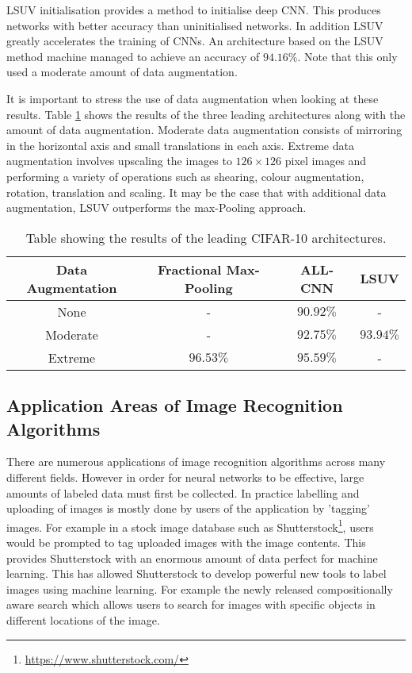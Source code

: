 LSUV initialisation provides a method to initialise deep CNN. This produces networks with better accuracy than uninitialised networks. In addition LSUV greatly accelerates the training of CNNs. An architecture based on the LSUV method machine managed to achieve an accuracy of $94.16\%$. Note that this only used a moderate amount of data augmentation.

It is important to stress the use of data augmentation when looking at these results. Table \ref{tab:SOA_res} shows the results of the three leading architectures along with the amount of data augmentation. Moderate data augmentation consists of mirroring in the horizontal axis and small translations in each axis. Extreme data augmentation involves upscaling the images to $126\times126$ pixel images and performing a variety of operations such as shearing, colour augmentation, rotation, translation and scaling. It may be the case that with additional data augmentation, LSUV outperforms the max-Pooling approach.

\begin{table}[h]
\begin{center}
 \begin{tabular}{||c | c c c||}
 \hline
 \textbf{Data Augmentation} & \textbf{Fractional Max-Pooling} & \textbf{ALL-CNN} & \textbf{LSUV} \\ [0.5ex]
 \hline
 None & - & $90.92\%$ & - \\
 \hline
 Moderate & - & $92.75\%$ & $93.94\%$\\
 \hline
 Extreme & $96.53\%$ & $95.59\%$ & - \\ [1ex]
 \hline

\end{tabular}
\caption{Table showing the results of the leading CIFAR-10 architectures.}
\label{tab:SOA_res}
\end{center}
\end{table}


\subsection{Application Areas of Image Recognition Algorithms}
\label{sec:Application_img_rec}

There are numerous applications of image recognition algorithms across many different fields. However in order for neural networks to be effective, large amounts of labeled data must first be collected. In practice labelling and uploading of images is mostly done by users of the application by 'tagging' images. For example in a stock image database such as Shutterstock\footnote{\url{https://www.shutterstock.com/}}, users would be prompted to tag uploaded images with the image contents. This provides Shutterstock with an enormous amount of data perfect for machine learning. This has allowed Shutterstock to develop powerful new tools to label images using machine learning. For example the newly released compositionally aware search which allows users to search for images with specific objects in different locations of the image\cite{ranzingercomposition}.

